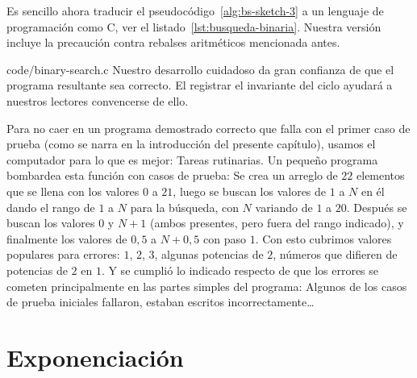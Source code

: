   Es sencillo ahora traducir el pseudocódigo~\ref{alg:bs-sketch-3}
  a un lenguaje de programación como C,%
  ver el listado~\ref{lst:busqueda-binaria}.
  Nuestra versión incluye la precaución contra rebalses aritméticos
  mencionada antes.
  
		   {code/binary-search.c}
  Nuestro desarrollo cuidadoso
  da gran confianza de que el programa resultante sea correcto.
  El registrar el invariante del ciclo ayudará a nuestros lectores
  convencerse de ello.

  Para no caer en un programa demostrado correcto
  que falla con el primer caso de prueba
  (como se narra en la introducción del presente capítulo),
  usamos el computador para lo que es mejor:
  Tareas rutinarias.
  Un pequeño programa bombardea esta función con casos de prueba:
  Se crea un arreglo de \(22\) elementos
  que se llena con los valores \(0\) a \(21\),
  luego se buscan los valores de \(1\) a \(N\) en él
  dando el rango de \(1\) a \(N\) para la búsqueda,
  con \(N\) variando de \(1\) a \(20\).
  Después se buscan los valores \(0\) y \(N + 1\)
  (ambos presentes,
   pero fuera del rango indicado),
  y finalmente los valores de \(0,5\) a \(N + 0,5\)
  con paso \(1\).
  Con esto cubrimos valores populares para errores:
  \(1\), \(2\), \(3\),
  algunas potencias de \(2\),
  números que difieren de potencias de \(2\) en \(1\).
  Y se cumplió lo indicado
  respecto de que los errores se cometen
  principalmente en las partes simples
  del programa:
  Algunos de los casos de prueba iniciales fallaron,
  estaban escritos incorrectamente\ldots

\section{Exponenciación}
\label{sec:programa-exponenciar}

